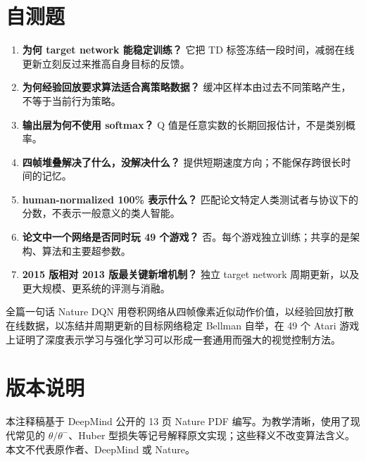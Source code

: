 \documentclass[UTF8,11pt]{ctexart}
\begin{document}
\section{自测题}
\begin{enumerate}
\item \textbf{为何 target network 能稳定训练？} 它把 TD 标签冻结一段时间，减弱在线更新立刻反过来推高自身目标的反馈。
\item \textbf{为何经验回放要求算法适合离策略数据？} 缓冲区样本由过去不同策略产生，不等于当前行为策略。
\item \textbf{输出层为何不使用 softmax？} Q 值是任意实数的长期回报估计，不是类别概率。
\item \textbf{四帧堆叠解决了什么，没解决什么？} 提供短期速度方向；不能保存跨很长时间的记忆。
\item \textbf{human-normalized 100\% 表示什么？} 匹配论文特定人类测试者与协议下的分数，不表示一般意义的类人智能。
\item \textbf{论文中一个网络是否同时玩 49 个游戏？} 否。每个游戏独立训练；共享的是架构、算法和主要超参数。
\item \textbf{2015 版相对 2013 版最关键新增机制？} 独立 target network 周期更新，以及更大规模、更系统的评测与消融。
\end{enumerate}

\begin{keybox}{全篇一句话}
Nature DQN 用卷积网络从四帧像素近似动作价值，以经验回放打散在线数据，以冻结并周期更新的目标网络稳定 Bellman 自举，在 49 个 Atari 游戏上证明了深度表示学习与强化学习可以形成一套通用而强大的视觉控制方法。
\end{keybox}

\section*{版本说明}
本注释稿基于 DeepMind 公开的 13 页 Nature PDF 编写。为教学清晰，使用了现代常见的 $\theta/\theta^-$、Huber 型损失等记号解释原文实现；这些释义不改变算法含义。本文不代表原作者、DeepMind 或 Nature。
\end{document}
